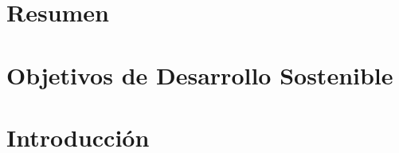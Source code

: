 \documentclass[a4page, 11pt, showtrims]{memoir}
\title{\izenburua}
\author{\egilea}
\date{\data}
\begin{document}
	
%




%
%
%

\cleardoublepage
\frontmatter


%



\chapter*{Resumen}

\cleardoublepage

\chapter*{Objetivos de Desarrollo Sostenible}

\cleardoublepage


\tableofcontents
\clearpage
\listoffigures
\clearpage
\listoftables
\clearpage
{}



\cleardoublepage
\mainmatter

\chapter{Introducción} \label{ch:chap1}

\clearpage
\end{document}

